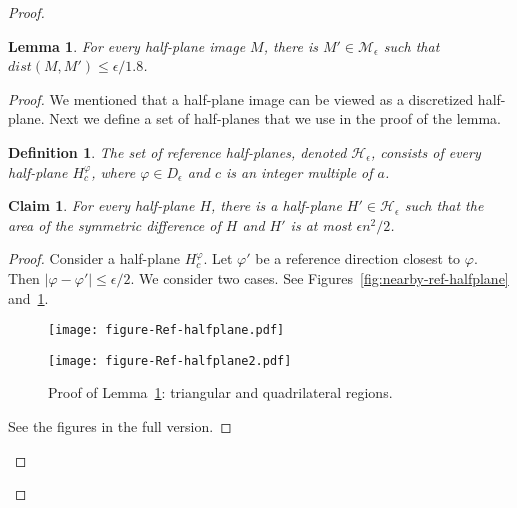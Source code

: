 \documentclass[11pt,english]{article}
\newtheorem{lemma}[theorem]{Lemma}
\newtheorem{claim}[theorem]{Claim}
\newtheorem{definition}{Definition}[section]
\numberwithin{figure}{section}
\newcommand{\eps}{{\epsilon}}
\newcommand{\dis}{dist}
\newcommand{\hp}[2]{H^{#1}_{#2}}\newcommand{\sepline}[2]{L^{#1}_{#2}}\newcommand{\hpi}[2]{M^{#1}_{#2}}\newcommand{\myerr}[1]{Err(#1)}
\newcommand{\mydelta}{\epsilon} \newcommand{\bigdelta}{{\epsilon_0}} \newcommand{\dsquares}{d_{\rm squares}}
\begin{document}
\begin{proof}
{\begin{lemma}\label{lem:properties-of-reference-HP}
 For every half-plane image $M$, there is $M'\in \mathcal M_\mydelta$ such that $\dis(M,M')\leq\mydelta/1.8$.
\end{lemma}

\begin{proof}
We mentioned that a half-plane image can be viewed as a discretized half-plane. Next we define a set of half-planes that we use in the proof of the lemma.
\begin{definition}\label{def:hp}
The set of reference half-planes, denoted $\mathcal H_{\mydelta}$, consists of every half-plane $\hp{\varphi}{c}$, where $\varphi\in D_\mydelta$ and $c$ is an integer multiple of $a$. 
\end{definition}
\begin{claim}\label{cl:properties-of-reference-HP}
For every half-plane $H$, there is a half-plane $H'\in\mathcal{H_{\eps}}$ such that the area of the symmetric difference of $H$ and $H'$ is at most $\mydelta n^2/2$.
\end{claim}
\begin{proof}
Consider a half-plane $\hp{\varphi}{c}$. Let $\varphi'$ be a reference direction closest to $\varphi$. Then $|\varphi-\varphi'|\le\mydelta/2$. 
We consider two cases. 
\ifnum{}
See Figures~\ref{fig:nearby-ref-halfplane} and~\ref{fig:nearby-ref-halfplane2}.

\begin{figure}[ht]
\begin{minipage}[b]{0.45\linewidth}
\centering
\texttt{[image: figure-Ref-halfplane.pdf]}
\caption{Proof of Lemma~\ref{lem:properties-of-reference-HP}: triangular regions.}
\label{fig:nearby-ref-halfplane}
\end{minipage}
\hspace{0.1\linewidth}
\begin{minipage}[b]{0.45\linewidth}
\centering
\texttt{[image: figure-Ref-halfplane2.pdf]}
\caption{Proof of Lemma~\ref{lem:properties-of-reference-HP}: triangular and quadrilateral regions.}
\label{fig:nearby-ref-halfplane2}
\end{minipage}
\end{figure}

\else
See the figures in the {\color{black} full version}.
\fi


\end{proof}
\end{proof}}
\end{proof}
\end{document}
